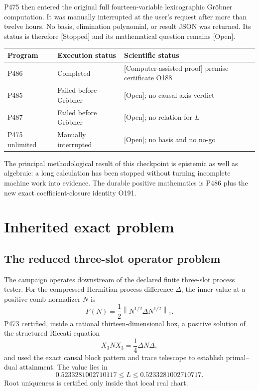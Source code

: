 \documentclass[11pt,a4paper,openany]{report}
\newcommand{\statusCAP}{\textcolor{fingreen}{[Computer-assisted proof]}}
\newcommand{\statusOpen}{\textcolor{finorange}{[Open]}}
\newcommand{\statusStopped}{\textcolor{finred}{[Stopped]}}
\begin{document}
P475 then entered the original full fourteen-variable lexicographic Gröbner
computation. It was manually interrupted at the user's request after more
than twelve hours. No basis, elimination polynomial, or result JSON was
returned. Its status is therefore \statusStopped{} and its mathematical
question remains \statusOpen{}.

\begin{center}\small
\begin{longtable}{@{}p{}p{}p{}@{}}
\toprule
\textbf{Program} & \textbf{Execution status} & \textbf{Scientific status}\\ \midrule\endhead
P486 & Completed & \statusCAP{} premise certificate O188\\
P485 & Failed before Gröbner & \statusOpen{}; no causal-axis verdict\\
P487 & Failed before Gröbner & \statusOpen{}; no relation for \(L\)\\
P475 unlimited & Manually interrupted & \statusOpen{}; no basis and no no-go\\
\bottomrule
\end{longtable}
\end{center}

The principal methodological result of this checkpoint is epistemic as well
as algebraic: a long calculation has been stopped without turning incomplete
machine work into evidence. The durable positive mathematics is P486 plus the
new exact coefficient-closure identity O191.

\chapter{Inherited exact problem}

\section{The reduced three-slot operator problem}

The campaign operates downstream of the declared finite three-slot process
tester. For the compressed Hermitian process difference \(\Delta\), the
inner value at a positive comb normalizer \(N\) is
\[
 F(N)=\frac12\left\|N^{1/2}\Delta N^{1/2}\right\|_1.
\]
P473 certified, inside a rational thirteen-dimensional box, a positive
solution of the structured Riccati equation
\[
 X_3 N X_3=\frac14\Delta N\Delta,                                  \tag{2.1}
\]
and used the exact causal block pattern and trace telescope to establish
primal--dual attainment. The value lies in
\[
 0.5233281002710117\le L\le0.5233281002710717.                      \tag{2.2}
\]
Root uniqueness is certified only inside that local real chart.
\end{document}
